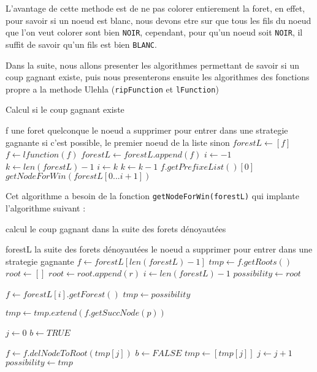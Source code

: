 L'avantage de cette methode est de ne pas colorer entierement la foret, en effet, pour savoir si un noeud est blanc, nous devons etre sur que tous les fils du noeud que l'on veut colorer sont bien \texttt{NOIR}, cependant, pour qu'un noeud soit \texttt{NOIR}, il suffit de savoir qu'un fils est bien \texttt{BLANC}.

Dans la suite, nous allons presenter les algorithmes permettant de savoir si un coup gagnant existe, puis nous presenterons ensuite les algorithmes des fonctions propre a la methode Ulehla (\texttt{ripFunction} et \texttt{lFunction})

\begin{algorithm}[hbt]
  \caption{Calcul si le coup gagnant existe}
  \begin{algorithmic}
    \REQUIRE f une foret quelconque
    \ENSURE le noeud a supprimer pour entrer dans une strategie gagnante si c'est possible, le premier noeud de la liste sinon
    \STATE $forestL \leftarrow [f]$
      \STATE $f \leftarrow lfunction(f)$
      \STATE $forestL \leftarrow forestL.append(f)$
    \ENDWHILE
    \STATE $i \leftarrow -1$
    \STATE $k \leftarrow len(forestL) - 1$
        \STATE $i \leftarrow k$
      \ENDIF
      \STATE $k \leftarrow k - 1$
    \ENDWHILE
      \RETURN $f.getPrefixeList()[0]$
    \ELSE
      \RETURN $getNodeForWin(forestL[0...i + 1])$
    \ENDIF
  \end{algorithmic}
\end{algorithm}

Cet algorithme a besoin de la fonction \texttt{getNodeForWin(forestL)} qui implante l'algorithme suivant :
\clearpage
\begin{algorithm}[hbt]
  \caption{calcul le coup gagnant dans la suite des forets dénoyautées}
  \begin{algorithmic}
    \REQUIRE forestL la suite des forets dénoyautées
    \ENSURE le noeud a supprimer pour entrer dans une strategie gagnante
    \STATE $f \leftarrow forestL[len(forestL) - 1]$
    \STATE $tmp \leftarrow f.getRoots()$
    \STATE $root \leftarrow []$
          \STATE $root \leftarrow root.append(r)$
        \ENDIF
    \ENDFOR
    \STATE $i \leftarrow len(forestL) - 1$
    \STATE $possibility \leftarrow root$

      \STATE $f \leftarrow forestL[i].getForest()$
      \STATE $tmp \leftarrow possibility$

        \STATE $tmp \leftarrow tmp.extend(f.getSuccNode(p))$
      \ENDFOR

      \STATE $j \leftarrow 0$
      \STATE $b \leftarrow TRUE$

        \STATE $f \leftarrow f.delNodeToRoot(tmp[j])$
          \STATE $b \leftarrow FALSE$
          \STATE $tmp \leftarrow [tmp[j]]$
        \ENDIF
        \STATE $j \leftarrow j + 1$
      \ENDWHILE
      \STATE $possibility \leftarrow tmp$
    \ENDWHILE
  \end{algorithmic}
\end{algorithm}

